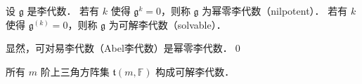 
\begin{definition}
设 $\mathfrak{g}$ 是李代数．
若有 $k$ 使得 $\mathfrak{g}^k=0$，则称 $\mathfrak{g}$ 为{\heiti 幂零李代数}（nilpotent）．
若有 $k$ 使得 $\mathfrak{g}^{(k)}=0$，则称 $\mathfrak{g}$ 为{\heiti 可解李代数}（solvable）．
\end{definition}

\begin{example}
显然，可对易李代数（Abel李代数）是幂零李代数．\qed
\end{example}

\begin{example}
    所有 $m$ 阶上三角方阵集 $\mathfrak{t}(m, \mathbb{F})$ 构成可解李代数．
\end{example}

